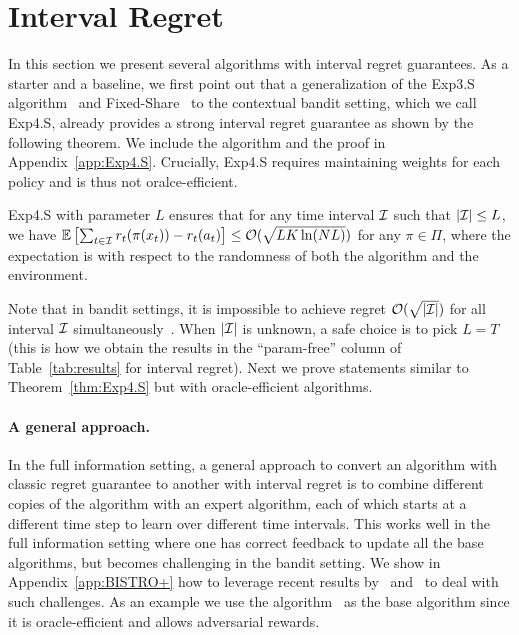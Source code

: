 \section{Interval Regret}\label{sec:interval_regret}

In this section we present several algorithms with interval regret
guarantees.  As a starter and a baseline, we first point out that a
generalization of the Exp3.S algorithm~\citep{AuerCeFrSc02} and
Fixed-Share~\citep{HerbsterWa98} to the contextual bandit setting,
which we call Exp4.S, already provides a strong interval regret
guarantee as shown by the following theorem. We include the algorithm
and the proof in Appendix~\ref{app:Exp4.S}.  Crucially, Exp4.S
requires maintaining weights for each policy and is thus not oralce-efficient.

\begin{theorem}\label{thm:Exp4.S}
Exp4.S with parameter $L$ ensures that for any time interval ${\mathcal{I}}$
such that $|{\mathcal{I}}| \leq L$, we have $\mathbb{E}\left[
  \sum_{t\in{\mathcal{I}}}r_t(\pi(x_t)) - r_t(a_t) \right] \leq
\mathcal{O}(\sqrt{LK\ln(NL)})$ for any $\pi \in \Pi$, where the expectation
is with respect to the randomness of both the algorithm and the
environment.
\end{theorem}

Note that in bandit settings, it is impossible to achieve regret
$\mathcal{O}(\sqrt{|{\mathcal{I}}|})$ for all interval ${\mathcal{I}}$ simultaneously~\citep{DanielyGoSh15}.
When $|{\mathcal{I}}|$ is unknown, a safe choice is to pick $L = T$
(this is how we obtain the results in the ``param-free'' column of Table~\ref{tab:results} for interval regret).
Next we prove statements similar to Theorem~\ref{thm:Exp4.S} but with
oracle-efficient algorithms. 

\paragraph{A general approach.}
In the full information setting, a general approach to convert an algorithm with classic regret guarantee
to another with interval regret is to combine different copies of the algorithm with an expert algorithm,
each of which starts at a different time step to learn over different time intervals.
This works well in the full information setting where one has correct feedback to update all the base algorithms,
but becomes challenging in the bandit setting.
We show in Appendix~\ref{app:BISTRO+} how to leverage recent results by~\citet{AgarwalLuNeSc17}
and~\citet{wei2018more} to deal with such challenges.
As an example we use the \bistro algorithm~\citep{SyrgkanisLuKrSc16, rakhlin2016bistro} as the base algorithm
since it is oracle-efficient and allows adversarial rewards.

